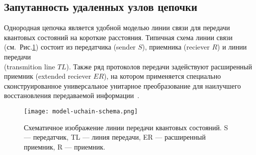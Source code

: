 \subsection{Запутанность удаленных узлов цепочки}
\label{subsec:entanglement-of-remote-chain-nodes}
Однородная цепочка является удобной моделью линии связи для передачи квантовых состояний на короткие расстояния.
Типичная схема линии связи (см.~Рис.\ref{fig:model-uchain-schema}) состоит из передатчика (sender $S$),
приемника (reciever $R$)
и линии передачи \\ (transmition line $TL$).
Также ряд протоколов передачи задействуют расширенный приемник (extended reciever $ER$),
на котором применяется специально сконструированное универсальное унитарное преобразование для наилучшего восстановления передаваемой информации~\cite{Feldman2021}.

\begin{figure}[H]
  \centering
  \texttt{[image: model-uchain-schema.png]}
  \caption{
    Схематичное изображение линии передачи квантовых состояний.
    S --- передатчик,
    TL --- линия передачи,
    ER --- расширенный приемник,
    R --- приемник.
  }
  \label{fig:model-uchain-schema}
\end{figure}

